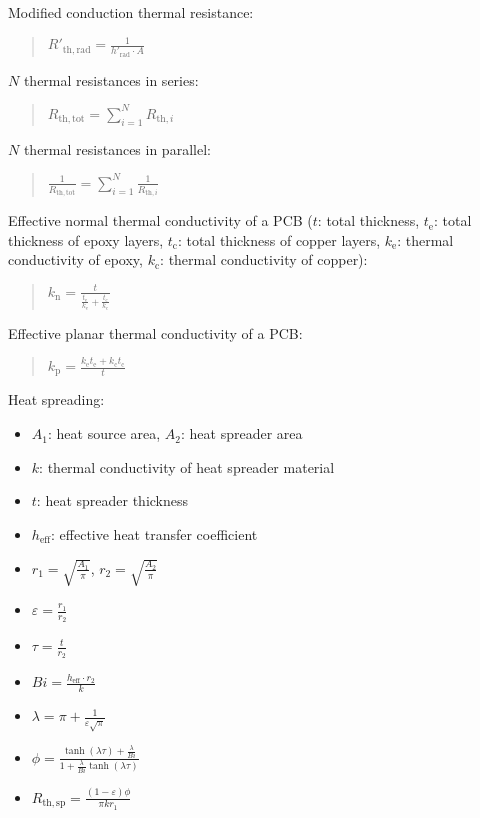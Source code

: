 \documentclass[fontsize=9pt,a4paper,twocolumn]{scrartcl}
\begin{document}
Modified conduction thermal resistance:
\begin{quote}
	$R'_{\mathrm{th},\mathrm{rad}} = \frac{1}{h'_\mathrm{rad}\cdot A}$
\end{quote}

$N$ thermal resistances in series:
\begin{quote}
	$R_{\mathrm{th},\mathrm{tot}} = \sum_{i=1}^N R_{\mathrm{th},i}$ 
\end{quote}

$N$ thermal resistances in parallel:
\begin{quote}
	$\frac{1}{R_{\mathrm{th},\mathrm{tot}}} = \sum_{i=1}^N \frac{1}{R_{\mathrm{th},i}}$
\end{quote}

Effective normal thermal conductivity of a PCB ($t$: total thickness, $t_\mathrm{e}$: total thickness of epoxy layers, $t_\mathrm{c}$: total thickness of copper layers, $k_\mathrm{e}$: thermal conductivity of epoxy, $k_\mathrm{c}$: thermal conductivity of copper):
\begin{quote}
	$k_\mathrm{n} = \frac{t}{\frac{t_\mathrm{e}}{k_\mathrm{e}} + \frac{t_\mathrm{c}}{k_\mathrm{c}}}$
\end{quote}

Effective planar thermal conductivity of a PCB:
\begin{quote}
	$k_\mathrm{p} = \frac{k_\mathrm{e} t_\mathrm{e} + k_\mathrm{c} t_\mathrm{c}}{t}$
\end{quote}

Heat spreading:
\begin{itemize}
	\item $A_1$: heat source area, $A_2$: heat spreader area
	\item $k$: thermal conductivity of heat spreader material
	\item $t$: heat spreader thickness
	\item $h_\mathrm{eff}$: effective heat transfer coefficient 
	\item $r_1=\sqrt{\frac{A_1}{\pi}}$, $r_2=\sqrt{\frac{A_2}{\pi}}$
	\item $\varepsilon=\frac{r_1}{r_2}$
	\item $\tau=\frac{t}{r_2}$
	\item $Bi = \frac {h_\mathrm{eff}\cdot r_2}{k}$
	\item $\lambda = \pi + \frac{1}{\varepsilon\sqrt{\pi}}$
	\item $\phi = \frac{\tanh(\lambda\tau)+\frac{\lambda}{Bi}}{1 + \frac{\lambda}{Bi} \tanh(\lambda\tau)}$
	\item $R_{\mathrm{th},\mathrm{sp}} = \frac{(1-\varepsilon)\phi}{\pi k r_1}$
\end{itemize}
\end{document}

